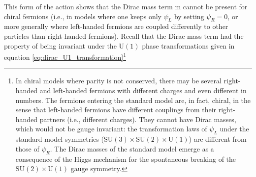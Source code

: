 This form of the action shows that the Dirac mass term m cannot be present for chiral fermions (i.e., in models where one keeps only \(\psi_L\) by setting \(\psi_R = 0\), or more generally where left-handed fermions are coupled differently to other particles than right-handed fermions). Recall that the Dirac mass term had the property of being invariant under the \(\mathrm{U}(1)\) phase transformations given in equation \eqref{eq:dirac_U1_transformation}\footnote{In chiral models where parity is not conserved, there may be several right-handed and left-handed fermions with different charges and even different in numbers. The fermions entering the standard model are, in fact, chiral, in the sense that left-handed fermions have different couplings from their right-handed partners (i.e., different charges). They cannot have Dirac masses, which would not be gauge invariant: the transformation laws of \(\psi_L\) under the standard model symmetries (\(\mathrm{SU}(3)\times \mathrm{SU}(2)\times \mathrm{U}(1)\)) are different from those of \(\psi_R\). The Dirac masses of the standard model emerge as a consequence of the Higgs mechanism for the spontaneous breaking of the \(\mathrm{SU}(2)\times\mathrm{U}(1)\) gauge symmetry.}

